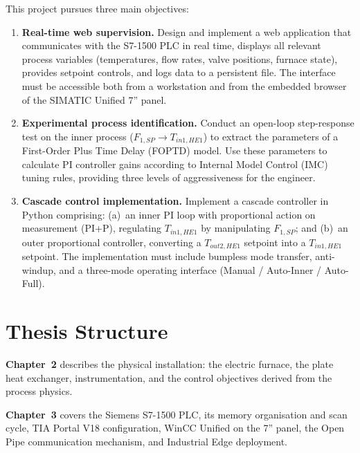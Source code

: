This project pursues three main objectives:

\begin{enumerate}[leftmargin=*, itemsep=4pt]

  \item \textbf{Real-time web supervision.}
    Design and implement a web application that communicates with the S7-1500 PLC in real
    time, displays all relevant process variables (temperatures, flow rates, valve positions,
    furnace state), provides setpoint controls, and logs data to a persistent file. The
    interface must be accessible both from a workstation and from the embedded browser of
    the SIMATIC Unified 7\textquotedblright{} panel.

  \item \textbf{Experimental process identification.}
    Conduct an open-loop step-response test on the inner process ($F_{1,SP} \rightarrow
    T_{in1,HE1}$) to extract the parameters of a First-Order Plus Time Delay (FOPTD)
    model. Use these parameters to calculate PI controller gains according to Internal Model
    Control (IMC) tuning rules, providing three levels of aggressiveness for the engineer.

  \item \textbf{Cascade control implementation.}
    Implement a cascade controller in Python comprising: (a)~an inner PI loop with
    proportional action on measurement (PI+P), regulating $T_{in1,HE1}$ by manipulating
    $F_{1,SP}$; and (b)~an outer proportional controller, converting a $T_{out2,HE1}$
    setpoint into a $T_{in1,HE1}$ setpoint. The implementation must include bumpless mode
    transfer, anti-windup, and a three-mode operating interface (Manual / Auto-Inner /
    Auto-Full).

\end{enumerate}

\section{Thesis Structure}

\textbf{Chapter~2} describes the physical installation: the electric furnace, the plate
heat exchanger, instrumentation, and the control objectives derived from the process physics.

\textbf{Chapter~3} covers the Siemens S7-1500 PLC, its memory organisation and scan cycle,
TIA Portal V18 configuration, WinCC Unified on the 7\textquotedblright{} panel, the Open
Pipe communication mechanism, and Industrial Edge deployment.

